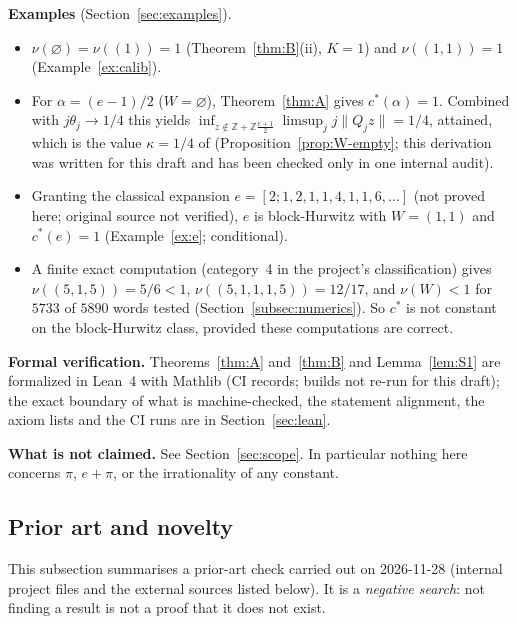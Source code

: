 \documentclass[11pt]{amsart}
\theoremstyle{definition}
\theoremstyle{remark}
\newcommand{\Z}{\mathbb{Z}}
\newcommand{\dist}[1]{\lVert #1\rVert}
\begin{document}
\medskip\noindent\textbf{Examples} (Section~\ref{sec:examples}).
\begin{itemize}
\item $\nu(\varnothing)=\nu((1))=1$ (Theorem~\ref{thm:B}(ii), $K=1$) and $\nu((1,1))=1$
(Example~\ref{ex:calib}).
\item For $\alpha=(e-1)/2$ ($W=\varnothing$), Theorem~\ref{thm:A} gives $c^*(\alpha)=1$. Combined with
$j\theta_j\to1/4$ this yields $\inf_{z\notin\Z+\Z\frac{e+1}2}\limsup_j j\dist{Q_jz}=1/4$, attained, which is
the value $\kappa=1/4$ of \cite{D5} (Proposition~\ref{prop:W-empty}; this derivation was written for this draft and
has been checked only in one internal audit).
\item Granting the classical expansion $e=[2;1,2,1,1,4,1,1,6,\dots]$ (not proved here; original source not
verified), $e$ is block-Hurwitz with $W=(1,1)$ and $c^*(e)=1$ (Example~\ref{ex:e}; conditional).
\item A finite exact computation (category~4 in the project's classification) gives $\nu((5,1,5))=5/6<1$,
$\nu((5,1,1,1,5))=12/17$, and $\nu(W)<1$ for $5733$ of $5890$ words tested (Section~\ref{subsec:numerics}). So
$c^*$ is not constant on the block-Hurwitz class, provided these computations are correct.
\end{itemize}

\medskip\noindent\textbf{Formal verification.} Theorems~\ref{thm:A} and~\ref{thm:B} and Lemma~\ref{lem:S1}
are formalized in Lean~4 with Mathlib (CI records; builds not re-run for this draft); the exact boundary of what is machine-checked, the statement
alignment, the axiom lists and the CI runs are in Section~\ref{sec:lean}.

\medskip\noindent\textbf{What is not claimed.} See Section~\ref{sec:scope}. In particular nothing here
concerns $\pi$, $e+\pi$, or the irrationality of any constant.

\subsection{Prior art and novelty}\label{subsec:prior}
This subsection summarises a prior-art check carried out on 2026-11-28 (internal project files and the
external sources listed below). It is a \emph{negative search}: not finding a result is not a proof that it
does not exist.
\end{document}
